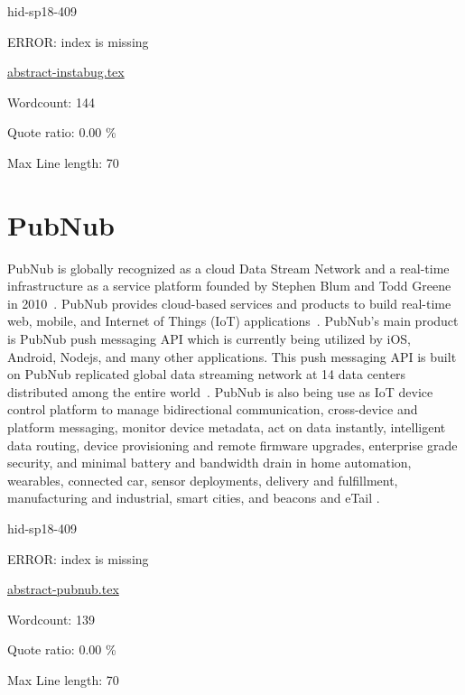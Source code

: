 \begin{IU}

hid-sp18-409

ERROR: index is missing

\href{https://github.com/cloudmesh-community/hid-sp18-409/blob/master//technology/abstract-instabug.tex}{abstract-instabug.tex}

 

Wordcount: 144


Quote ratio: 0.00 \%
 
Max Line length: 70
\end{IU}

\section{PubNub}

PubNub is globally recognized as a cloud Data Stream Network and a
real-time infrastructure as a service platform founded by Stephen Blum
and Todd Greene in 2010~\cite{ hid-sp18-409-www-pubnub}. PubNub
provides cloud-based services and products to build real-time web,
mobile, and Internet of Things (IoT) applications~\cite{
  hid-sp18-409-www-pubnub-wikipedia}. PubNub's main product is PubNub
push messaging API which is currently being utilized by iOS, Android,
Nodejs, and many other applications.  This push messaging API is built
on PubNub replicated global data streaming network at 14 data centers
distributed among the entire
world~\cite{hid-sp18-409-www-pubnub-wikipedia}.  PubNub is also being
use as IoT device control platform to manage bidirectional
communication, cross-device and platform messaging, monitor device
metadata, act on data instantly, intelligent data routing, device
provisioning and remote firmware upgrades, enterprise grade security,
and minimal battery and bandwidth drain in home automation, wearables,
connected car, sensor deployments, delivery and fulfillment,
manufacturing and industrial, smart cities, and beacons and eTail
\cite{hid-sp18-409-www-pubnub}.


\begin{IU}

hid-sp18-409

ERROR: index is missing

\href{https://github.com/cloudmesh-community/hid-sp18-409/blob/master//technology/abstract-pubnub.tex}{abstract-pubnub.tex}

 

Wordcount: 139


Quote ratio: 0.00 \%
 
Max Line length: 70
\end{IU}

